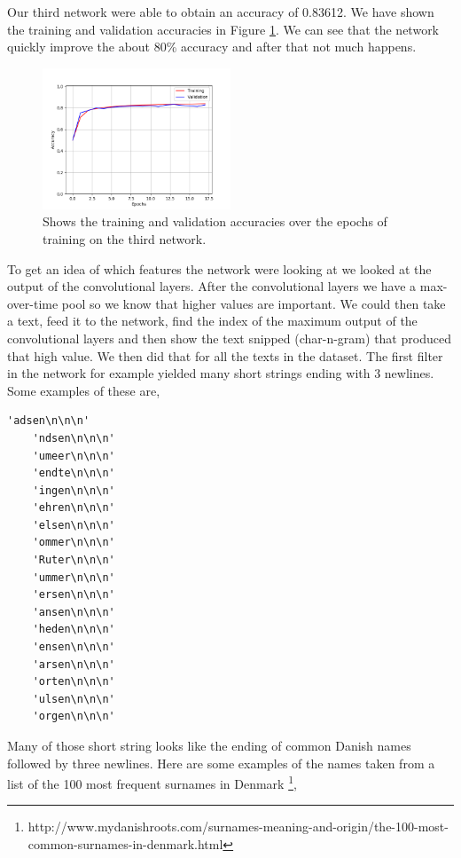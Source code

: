 Our third network were able to obtain an accuracy of 0.83612. We have shown the
training and validation accuracies in Figure \ref{fig:network_3_accuracies}. We
can see that the network quickly improve the about 80\% accuracy and after that
not much happens.

\begin{figure}
    \centering
    \includegraphics[width=0.5\textwidth]{./pictures/method/network_3_accuracies.png}
    \caption{Shows the training and validation accuracies over the epochs of
        training on the third network.}
    \label{fig:network_3_accuracies}
\end{figure}

To get an idea of which features the network were looking at we looked at the
output of the convolutional layers. After the convolutional layers we have a
max-over-time pool so we know that higher values are important. We could then
take a text, feed it to the network, find the index of the maximum output of
the convolutional layers and then show the text snipped (char-n-gram) that
produced that high value. We then did that for all the texts in the dataset. The
first filter in the network for example yielded many short strings ending with 3
newlines. Some examples of these are,

\begin{lstlisting}[gobble=4]
    'adsen\n\n\n'
    'ndsen\n\n\n'
    'umeer\n\n\n'
    'endte\n\n\n'
    'ingen\n\n\n'
    'ehren\n\n\n'
    'elsen\n\n\n'
    'ommer\n\n\n'
    'Ruter\n\n\n'
    'ummer\n\n\n'
    'ersen\n\n\n'
    'ansen\n\n\n'
    'heden\n\n\n'
    'ensen\n\n\n'
    'arsen\n\n\n'
    'orten\n\n\n'
    'ulsen\n\n\n'
    'orgen\n\n\n'
\end{lstlisting}

Many of those short string looks like the ending of common Danish
names followed by three newlines. Here are some examples of the
names taken from a list of the 100 most frequent surnames in Denmark
\footnote{http://www.mydanishroots.com/surnames-meaning-and-origin/the-100-most-
common-surnames-in-denmark.html},

